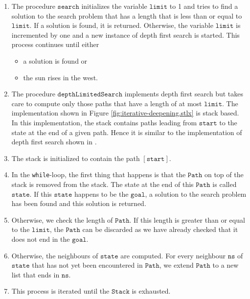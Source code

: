 \begin{enumerate}
\item The procedure $\mathtt{search}$ initializes the variable $\mathtt{limit}$ to 1 and tries to find a solution
      to the search problem that has a length that is less than or equal to $\mathtt{limit}$.  If a solution is
      found, it is returned.  Otherwise, the variable $\mathtt{limit}$ is incremented by one and a
      new instance of depth first search is started.  This process continues until either
      \begin{itemize}
      \item a solution is found \qquad or
      \item the sun rises in the west.
      \end{itemize}
\item The procedure $\mathtt{depthLimitedSearch}$ implements depth first search but takes care to compute only
      those paths that have a length of at most $\mathtt{limit}$.  The implementation shown in Figure
      \ref{fig:iterative-deepening.stlx} is stack based.  In this implementation,
      the stack contains paths leading from $\mathtt{start}$ to the state at the end of a given
      path.  Hence it is similar to the implementation of depth first search shown in
      .
\item The stack is initialized to contain the path $\mathtt{[start]}$.
\item In the \texttt{while}-loop, the first thing that happens is that the $\mathtt{Path}$ on top of
      the stack is removed from the stack.  The state at the end of this $\mathtt{Path}$ is called $\mathtt{state}$.
      If this $\mathtt{state}$ happens to be the $\mathtt{goal}$, a solution to the search problem
      has been found and this solution is returned.
\item Otherwise, we check the length of $\mathtt{Path}$.  If this length is greater than or equal to the
      $\mathtt{limit}$, the $\mathtt{Path}$ can be discarded as we have already checked that it
      does not end in the $\mathtt{goal}$.
\item Otherwise, the neighbours of $\mathtt{state}$ are computed.  For every neighbour $\mathtt{ns}$
      of $\mathtt{state}$ that has not yet been encountered in $\mathtt{Path}$, we extend
      $\mathtt{Path}$ to a new list that ends in $\mathtt{ns}$.
\item This process is iterated until the $\mathtt{Stack}$ is exhausted.
\end{enumerate}
